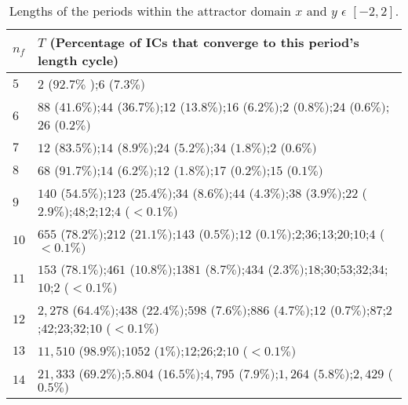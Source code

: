 \begin{table*}[!t]
\renewcommand{\arraystretch}{1.3}

\caption{Lengths of the periods within the attractor domain $x$ and $y$ $\epsilon$  $[-2,2]$.}
\label{tabla}
\centering
\fontsize{9}{9}\selectfont
\begin{tabular}{l  l  }
\hline
$n_f$ & $T$ {\scriptsize(Percentage of ICs that converge to this period's length cycle)}  \\
\hline
\hline
$5$ & $2$ {\scriptsize($92.7\%$ )};$6$  {\scriptsize($7.3\% )$}\\
$6$ & $88$ {\scriptsize($41.6 \% )$};$44$ {\scriptsize($36.7 \% )$};$12$ {\scriptsize($13.8\% )$};$16$ {\scriptsize($6.2 \% )$};$2$ {\scriptsize($0.8 \% )$};$24$ {\scriptsize($0.6 \% )$};$26$ {\scriptsize($0.2 \%)$}\\
$7$ &  $12$ {\scriptsize($83.5 \% )$};$14$ {\scriptsize($8.9\% )$};$24$ {\scriptsize($5.2\% )$};$34$ {\scriptsize($1.8 \% )$};$2$ {\scriptsize($0.6\% )$} \\
$8$ & $68$ {\scriptsize($91.7\%)$};$14$ {\scriptsize($6.2\%)$};$12$ {\scriptsize($1.8 \%)$};$17$ {\scriptsize($0.2\% )$};$15$ {\scriptsize($0.1 \%)$}\\ 
$9$ & $140$ {\scriptsize($54.5 \%)$};$123$ {\scriptsize($25.4 \%)$};$34$ {\scriptsize($8.6\%)$};$44$ {\scriptsize($4.3 \%)$};$38$ {\scriptsize($3.9 \%)$};$22$ {\scriptsize($2.9 \%)$};$48$;$2$;$12$;$4$ {\scriptsize($<0.1\%)$}\\
$10$ & $655$ {\scriptsize($78.2\%)$};$212$ {\scriptsize($21.1\%)$};$143$ {\scriptsize($0.5\%)$};$12$ {\scriptsize($0.1\%)$};$2$;$36$;$13$;$20$;$10$;$4$ {\scriptsize($<0.1\%)$}\\
$11$ & $153$ {\scriptsize($78.1\%)$};$461$ {\scriptsize($10.8\% )$};$1381$ {\scriptsize($8.7\%)$};$434$ {\scriptsize($2.3\%)$};$18$;$30$;$53$;$32$;$34$;$10$;$2$ {\scriptsize($<0.1\% )$}\\
$12$ & $2,278$ {\scriptsize($64.4\%)$};$438$ {\scriptsize($22.4\% )$};$598$ {\scriptsize($7.6\% )$};$886$ {\scriptsize($4.7 \%)$};$12$ {\scriptsize($0.7\%)$};$87$;$2$;$42$;$23$;$32$;$10$ {\scriptsize($<0.1\% )$}\\
$13$ & $11,510$ {\scriptsize($ 98.9\%)$};$1052$ {\scriptsize($1 \%)$};$12$;$26$;$2$;$10$ {\scriptsize($<0.1\% )$}\\
$14$ & $21,333$ {\scriptsize($69.2\% )$};$5.804$ {\scriptsize($16.5\%  )$};$4,795$ {\scriptsize($7.9\%  )$};$1,264$ {\scriptsize($5.8 \% )$};$2,429$ {\scriptsize($0.5\% )$}\\ 

\end{tabular}
\end{table*}
